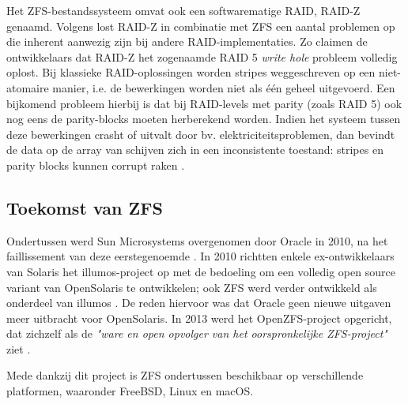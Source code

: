 Het ZFS-bestandssysteem omvat ook een softwarematige RAID, RAID-Z genaamd. Volgens \textcite{Bonwick2005} lost RAID-Z in combinatie met ZFS een aantal problemen op die inherent aanwezig zijn bij andere RAID-implementaties. Zo claimen de ontwikkelaars dat RAID-Z het zogenaamde RAID 5 \textit{write hole} probleem volledig oplost. Bij klassieke RAID-oplossingen worden stripes weggeschreven op een niet-atomaire manier, i.e. de bewerkingen worden niet als één geheel uitgevoerd. Een bijkomend probleem hierbij is dat bij RAID-levels met \gls{parity} (zoals RAID 5) ook nog eens de parity-blocks moeten herberekend worden. Indien het systeem tussen deze bewerkingen crasht of uitvalt door bv. elektriciteitsproblemen, dan bevindt de data op de array van schijven zich in een inconsistente toestand: stripes en \gls{parity} blocks kunnen corrupt raken \autocite{Bonwick2005}. 


\subsection{Toekomst van ZFS}

Ondertussen werd Sun Microsystems overgenomen door Oracle in 2010, na het faillissement van deze eerstegenoemde \autocite{OracleOnbekend}. In 2010 richtten enkele ex-ontwikkelaars van Solaris het illumos-project op met de bedoeling om een volledig open source variant van OpenSolaris te ontwikkelen; ook ZFS werd verder ontwikkeld als onderdeel van illumos \autocite{illumos2012}. De reden hiervoor was dat Oracle geen nieuwe uitgaven meer uitbracht voor OpenSolaris. In 2013 werd het OpenZFS-project opgericht, dat zichzelf als de \textit{"ware en open opvolger van het oorspronkelijke ZFS-project"} ziet \autocite{OpenZFSHistory2014}.

Mede dankzij dit project is ZFS ondertussen beschikbaar op verschillende platformen, waaronder FreeBSD, Linux en macOS.


